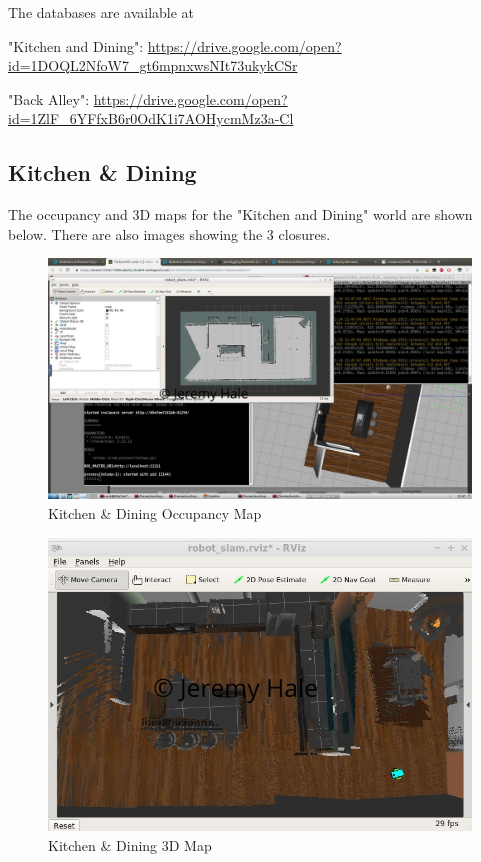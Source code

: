 \documentclass[10pt,journal,compsoc]{IEEEtran}
\begin{document}
The databases are available at

"Kitchen and Dining":
\url{https://drive.google.com/open?id=1DOQL2NfoW7_gt6mpnxwsNIt73ukykCSr}

"Back Alley":
\url{https://drive.google.com/open?id=1ZlF_6YFfxB6r0OdK1i7AOHycmMz3a-Cl}


\subsection{Kitchen \& Dining}

The occupancy and 3D maps for the "Kitchen and Dining" world are shown below. There are also images showing the 3 closures.

\begin{figure}[thpb]
    \centering
    \includegraphics[width=\linewidth]{dining_map}
    \caption{Kitchen \& Dining Occupancy Map}
    \label{fig:dining_2d}
\end{figure}

\begin{figure}
    \centering
    \includegraphics[width=\linewidth]{workspace_benchmark_crop}
    \caption{Kitchen \& Dining 3D Map}
    \label{fig:dining_3d}
\end{figure}
\end{document}
